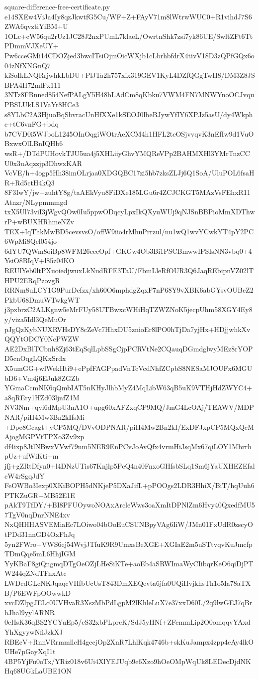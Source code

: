 \documentclass[11pt]{article}
\theoremstyle{definition}
\theoremstyle{remark}
\begin{document}
\begin{filecontents*}[overwrite]{square-difference-free-certificate.py}
e14SXEw4ViJa4Iy8qzJkwtfG5Cu/WF+Z+FAyV71m8lWtrwWUC0+R1vihdJ7S6ZWA6qvztiYiBM+U
1OLc+cW56qu2rUz1JC28J2nxPUmL7klaeL/OwrtnShk7zsi7yk86UE/SwltZFt6TtPDmmVJXeUY+
Pw6cceGMi14CDOZjed3bwcITsiOjmOicWXjb1cLbrhbfdrX4tivV18D3zQPfGQx6o04zNfXNGnQ7
kiSoIkLNQRrjwhkLbDU+PlJTa2h757xix319GEV1KyL4DZfQGgTwH8/DM3Z8JSBPA4H72mlFx111
3NTz8FBnned854NefPALgY5H48bLAdCm8qKbku7VWM4FN7MNWYnoOCJvquPBSLUkLS1VaYr8HCe3
s8YLbC2A3HjuoBqSbvracUnHfXXe1kSEOJ0lbeBJywYfIY6XPJz5asU/dy4Wkphe+tC6vnFG+bdq
b7CVD0i5WJboL1245OInOqgiWOtrAeXCM4h1HFL2teOSjvvqvK3nEfIw9d1VuOBxwxOlLBnIQHb6
wsR+/DTdPUHovkTJU5ua4j5XHLiiyGhvYMQReVPp2BAHMXHl3YMrTnzCCU0x3uAqzzjp3DhwxKAR
VcVE/h+4ogp5Hh38imOLrjaa0XDGQBC17zi5hb7zksZLJj6Q1SoA/UluPOL6fsaHR+Rd5ctH4kQ3
8F3IwY/jw+zuhtY8g/taAEkVyu8FiDXe185LGu6r4ZCJCKGT5MAzVsFEhxR11Atnzr/NLypmmmgd
txX5Ul73viI3jWgvQOw0Iu5ppwODqcyLpxIkQXyuWUj9qNJSnBBPioMmXDThwrP+wBUXHRhmeNZv
TEX+IqThkMwBD5cevsvsO/offW9iio4rMhuPrrzul/nu1wQ1wvYCwkYT4pY2PC6WpMi8Qel054jo
6dYU7QWm8oiBp8WFM26cceOpf+GKGw4Ob3Bi1PSCBmwwIPSIsNN3vbq0+4YsiO8BIqV+l85z04KO
REUlYeb0ltPXuoiedjwuxLkNudRFE3TaU/FbmLleRfOUR3Q6JaqREbipnVZ02lTHPU2ERqPzovgR
RRNm8uLCY1G9PurDcfzx/xh60O6mphdgZqxF7nP68Y9vXBK6abGYsvOUBcZ2PkbU68DmuWTwkgWT
j3pxbrzC2ALKgnw5eMrFUy58UTBwxcWHiHqTZWZNoK5jecpUhm58XGY4Ey8y/viza5Idl3QeMuOr
pJgQzKybNUXRVHsDY8cZeVc7HhxDU5znioEr8lPO0hTjDa7yjHx+HDjjwhkXvQQYtODCY0NcPWZW
AE2DxBlTCbnh8Zj63tEqSqlLpbSSgCjpPCRVtNe2CQauqDGmdglwyMEz8rYOPD5cnOqgLQKxSrdx
X5umGG+wlWekHti9+ePpfFAGPpadVnTcVcdNhfZCpbS8NESaMJOUFx6MGUbD6+Vm4j6EJuk8ZGZb
YGmaCcmNK6qQmbIAT5nKHyJlhbMyZ4MqLibW63qB5uK9VTHjHdZWYC4+a8qREry1HZd03ljnfZ1M
NV3Nm+qyi6dMpU3nA1O+upg60xAFZxqCP9MQ/JmG4LcOAj/TEAWV/MDPNAR/piH4Mw3Bn2kIfsMi
+Dpe8Gcagt+yCP5MQ/DVvODPNAR/piH4Mw2Bn2kI/ExDFJxpCP5MQxQcMAjogMGPVtTPXo3Zv9xp
df4ixp8JtlNBwxVVwf79nm5NER9EnPCvJoAvQfx4vrmHiJsqMx67qiLOY1MbrrhpUz+ufWiKti+m
jfj+gZRtDfyn0+l4DNzUTis67Knjlp5PcQ4n40FnxoGHfsbSLq1Sm6jYaUXHEZEfalcW4rSgqJdY
FeOWBo3Iexp0XKiBOPH5dNKjeP5DXaJifL+pPOOgs2LDR3HhiX/BiT/hqUuh6PTKZuGR+MB52E1E
pAkT9TfDY/+BI8PFUOywoNOAxArcleWws3oaXmItDPNlZm6Hvy40QxedfMU57TgV0nqDnrNNE4xv
NxQHHHASVEMiaEc7LOiwo04bOoEuCSUNBpyVAg6IiW/JMn01FxUdR0zscyOtPDd31nnGD4OxFhJq
5yn2FWro+VWS6ej54WvjJTfuK9R9UmxsBeXGE+XGIaE2m5uSTtvqvKuJmcfpTDmQqe5mL6HhjIGM
YyKBaF8giQngmqDTgOeOZjLHeSiKTe+aoEb4aSRWImaWyCIibqrKeO6qiDjPTW244qZNdTFnxAtc
LWDcdGLcNKJqaqcVHfbUcUsT843DmXEQevta6jfa0UQiHvjkhsTh1o5Ia78aTXB/P6EWFpOOwwkD
xvcDZlpgJELc0UVHvaR3XszMbPdLgpM2lKhleLuX7e37xxD60L/2q9lwGEJ7qBrhJhal9yylARNR
0eHsK36qBS2YCYuEp5/eS32xbPLprcK/SdJ5yHNf+ZFcmmLip2O0omqqvYAxdYhXgyywNfiJzkXJ
RBEcV+RnnVRrmmllcH4gecjOp2XnR7LhlKqk4746b+skKuJampx4zpp4eAy4lkOUHe7pGayXqI1t
4BP5YjFu0oTx/YRiz018v6Ui4XlYEJUqb9e6Xzo9hOeOMpWqUk8LEDecDjdNKHq68UGkLaUBE1ON

\end{filecontents*}
\end{document}
